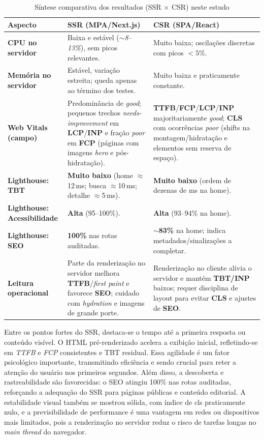 {\begin{table}[H]
\centering
\caption{Síntese comparativa dos resultados (SSR $\times$ CSR) neste estudo}
\label{tab:comparativo-ssr-csr}
\begin{tabular}{|p{4.2cm}|p{5.2cm}|p{5.2cm}|}
\hline
\textbf{Aspecto} & \textbf{SSR (MPA/Next.js)} & \textbf{CSR (SPA/React)} \\
\hline
\textbf{CPU no servidor} & Baixa e estável (\textit{$\sim$8--13\%}), sem picos relevantes. & Muito baixa; oscilações discretas com picos $<5\%$. \\
\hline
\textbf{Memória no servidor} & Estável, variação estreita; queda apenas ao término dos testes. & Muito baixa e praticamente constante. \\
\hline
\textbf{Web Vitals (campo)} & Predominância de \textit{good}; pequenos trechos \textit{needs-improvement} em \textbf{LCP}/\textbf{INP} e fração \textit{poor} em \textbf{FCP} (páginas com imagens \emph{hero} e pós-hidratação). & \textbf{TTFB}/\textbf{FCP}/\textbf{LCP}/\textbf{INP} majoritariamente \textit{good}; \textbf{CLS} com ocorrências \textit{poor} (shifts na montagem/hidratação e elementos sem reserva de espaço). \\
\hline
\textbf{Lighthouse: TBT} & \textbf{Muito baixo} (home $\approx$12\,ms; busca $\approx$10\,ms; detalhe $\approx$5\,ms). & \textbf{Muito baixo} (ordem de dezenas de ms na home). \\
\hline
\textbf{Lighthouse: Acessibilidade} & \textbf{Alta} (95--100\%). & \textbf{Alta} (93--94\% na home). \\
\hline
\textbf{Lighthouse: SEO} & \textbf{100\%} nas rotas auditadas. & \textbf{$\sim$83\%} na home; indica metadados/sinalizações a completar. \\
\hline
\textbf{Leitura operacional} & Parte da renderização no servidor melhora \textbf{TTFB}/\emph{first paint} e favorece \textbf{SEO}; cuidado com \emph{hydration} e imagens de grande porte. & Renderização no cliente alivia o servidor e mantém \textbf{TBT/INP} baixos; requer disciplina de layout para evitar \textbf{CLS} e ajustes de \textbf{SEO}. \\
\hline
\end{tabular}
\end{table}

Entre os pontos fortes do SSR, destaca-se o tempo até a primeira resposta ou conteúdo visível. O HTML pré-renderizado acelera a exibição inicial, refletindo-se em \textit{TTFB} e \textit{FCP} consistentes e TBT residual. Essa agilidade é um fator psicológico importante, transmitindo eficiência e sendo crucial para reter a atenção do usuário nos primeiros segundos. Além disso, a descoberta e rastreabilidade são favorecidas: o SEO atingiu 100\% nas rotas auditadas, reforçando a adequação do SSR para páginas públicas e conteúdo editorial. A estabilidade visual também se mostrou sólida, com índice de \acrshort{cls} praticamente nulo, e a previsibilidade de performance é uma vantagem em redes ou dispositivos mais limitados, pois a renderização no servidor reduz o risco de tarefas longas no \emph{main thread} do navegador.

}
